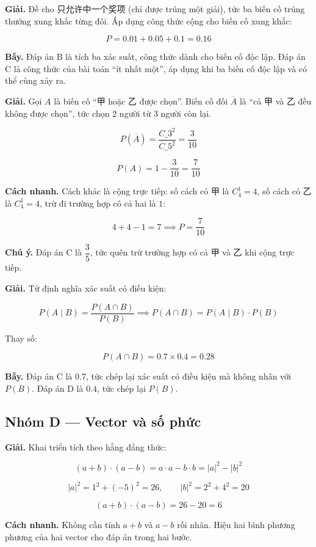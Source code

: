 \documentclass[11pt, a4paper]{article}
\begin{document}
\begin{dapan}[11 — Đáp án A]
\textbf{Giải.} Đề cho 只允许中一个奖项 (chỉ được trúng một giải), tức ba biến cố trúng thưởng xung khắc từng đôi. Áp dụng công thức cộng cho biến cố xung khắc:

$$P = 0.01 + 0.05 + 0.1 = 0.16$$

\textbf{Bẫy.} Đáp án B là tích ba xác suất, công thức dành cho biến cố độc lập. Đáp án C là công thức của bài toán “ít nhất một”, áp dụng khi ba biến cố độc lập và có thể cùng xảy ra.
\end{dapan}

\begin{dapan}[12 — Đáp án D]
\textbf{Giải.} Gọi $A$ là biến cố “甲 hoặc 乙 được chọn”. Biến cố đối $\overline{A}$ là “cả 甲 và 乙 đều không được chọn”, tức chọn $2$ người từ $3$ người còn lại.

$$P(\overline{A}) = \frac{C\_3^2}{C\_5^2} = \frac{3}{10}$$

$$P(A) = 1 - \frac{3}{10} = \frac{7}{10}$$

\textbf{Cách nhanh.} Cách khác là cộng trực tiếp: số cách có 甲 là $C_4^1 = 4$, số cách có 乙 là $C_4^1 = 4$, trừ đi trường hợp có cả hai là $1$:

$$4 + 4 - 1 = 7 \implies P = \frac{7}{10}$$

\textbf{Chú ý.} Đáp án C là $\dfrac{3}{5}$, tức quên trừ trường hợp có cả 甲 và 乙 khi cộng trực tiếp.
\end{dapan}

\begin{dapan}[13 — Đáp án A]
\textbf{Giải.} Từ định nghĩa xác suất có điều kiện:

$$P(A \mid B) = \frac{P(A \cap B)}{P(B)} \implies P(A \cap B) = P(A \mid B) \cdot P(B)$$

Thay số:

$$P(A \cap B) = 0.7 \times 0.4 = 0.28$$

\textbf{Bẫy.} Đáp án C là $0.7$, tức chép lại xác suất có điều kiện mà không nhân với $P(B)$. Đáp án D là $0.4$, tức chép lại $P(B)$.
\end{dapan}

\subsection*{Nhóm D — Vector và số phức}

\begin{dapan}[14 — Đáp án D]
\textbf{Giải.} Khai triển tích theo hằng đẳng thức:

$$(a+b)\cdot(a-b) = a \cdot a - b \cdot b = \lvert a \rvert^2 - \lvert b \rvert^2$$

$$\lvert a \rvert^2 = 1^2 + (-5)^2 = 26, \qquad \lvert b \rvert^2 = 2^2 + 4^2 = 20$$

$$(a+b)\cdot(a-b) = 26 - 20 = 6$$

\textbf{Cách nhanh.} Không cần tính $a+b$ và $a-b$ rồi nhân. Hiệu hai bình phương phương của hai vector cho đáp án trong hai bước.
\end{dapan}
\end{document}
